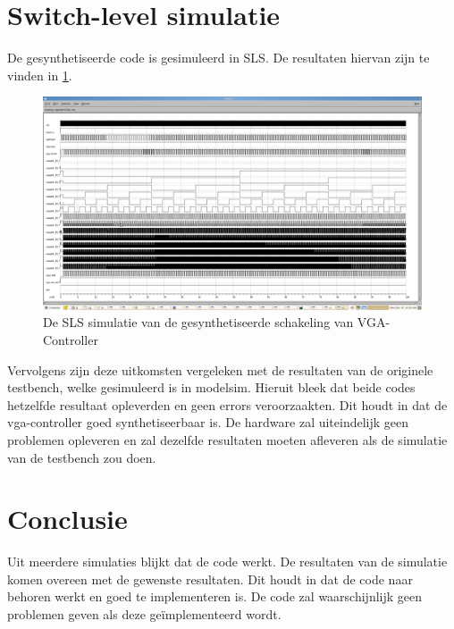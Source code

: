 \documentclass{scrartcl}  %
\begin{document}
\section{Switch-level simulatie}
De gesynthetiseerde code is gesimuleerd in SLS. De resultaten hiervan zijn te vinden in \ref{fig:switch}. 

\begin{figure}[H]
\centering
		\includegraphics[width=1\textwidth]{resource/simslsvga-final.png}
		
		\caption{De SLS simulatie van de gesynthetiseerde schakeling van VGA-Controller}
		\label{fig:switch}
\end{figure}
Vervolgens zijn deze uitkomsten vergeleken met de resultaten van de originele testbench, welke gesimuleerd is in modelsim. Hieruit bleek dat beide codes hetzelfde resultaat opleverden en geen errors veroorzaakten. Dit houdt in dat de vga-controller goed synthetiseerbaar is. De hardware zal uiteindelijk geen problemen opleveren en zal dezelfde resultaten moeten afleveren als de simulatie van de testbench zou doen. 


\section{Conclusie}
Uit meerdere simulaties blijkt dat de code werkt. De resultaten van de simulatie komen overeen met de gewenste resultaten. Dit houdt in dat de code naar behoren werkt en goed te implementeren is. De code zal waarschijnlijk geen problemen geven als deze geïmplementeerd wordt.
\end{document}
